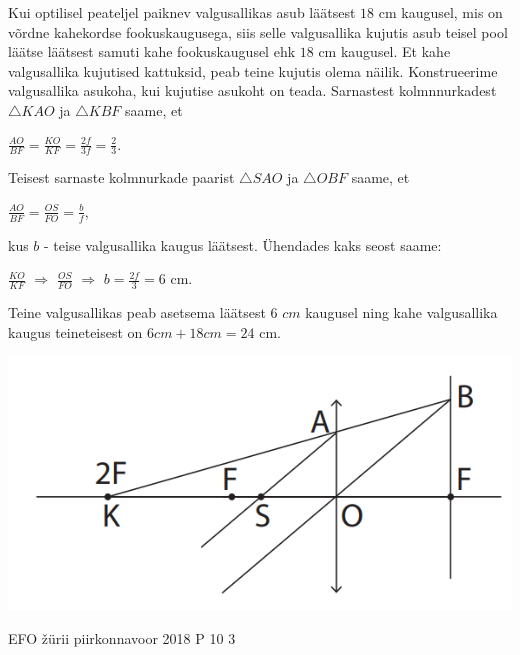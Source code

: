\documentclass[11pt]{article}
\begin{document}
{{\ifSolution
Kui optilisel peateljel paiknev valgusallikas asub läätsest $18$ cm kaugusel, mis on võrdne kahekordse fookuskaugusega, siis selle valgusallika kujutis asub teisel pool läätse läätsest samuti kahe fookuskaugusel ehk $18$ cm kaugusel. Et kahe valgusallika kujutised kattuksid, peab teine kujutis olema näilik. Konstrueerime valgusallika asukoha, kui kujutise asukoht on teada.
Sarnastest kolmnnurkadest $\triangle KAO$ ja $\triangle KBF$ saame, et 
\begin{center}
$\frac{AO}{BF} = \frac{KO}{KF} = \frac{2f}{3f} = \frac{2}{3}$.
\end{center}
Teisest sarnaste kolmnurkade paarist $\triangle SAO$ ja $\triangle OBF$ saame, et 
\begin{center}
$\frac{AO}{BF} = \frac{OS}{FO} = \frac{b}{f}$,
\end{center}
kus $b$ - teise valgusallika kaugus läätsest. Ühendades kaks seost saame:
\begin{center}
$\frac{KO}{KF}$ $\Rightarrow$ $\frac{OS}{FO}$ $\Rightarrow$ $b = \frac{2f}{3} = 6$ cm.
\end{center}
Teine valgusallikas peab asetsema läätsest $6$ $cm$ kaugusel ning kahe valgusallika kaugus teineteisest on $6 cm + 18 cm = 24$ cm.
\begin{center}
	\includegraphics[width=0.5\linewidth]{2018-v2p-09-lah.PNG}
\end{center}
\fi
}


{EFO žürii} %
{piirkonnavoor} %
{2018} %
{P 10} %
{3} %
{

}}
\end{document}
